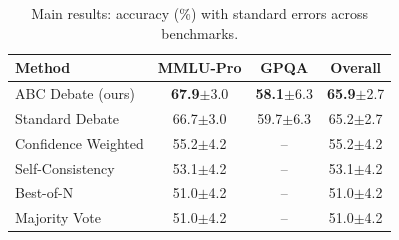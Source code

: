 \begin{table}[t]
\centering
\caption{Main results: accuracy (\%) with standard errors across benchmarks.}
\label{tab:main_results}
\small
\begin{tabular}{lccc}
\toprule
Method & MMLU-Pro & GPQA & Overall \\
\midrule
ABC Debate (ours) & \textbf{67.9}$\pm$3.0 & \textbf{58.1}$\pm$6.3 & \textbf{65.9}$\pm$2.7 \\
Standard Debate & 66.7$\pm$3.0 & 59.7$\pm$6.3 & 65.2$\pm$2.7 \\
Confidence Weighted & 55.2$\pm$4.2 & -- & 55.2$\pm$4.2 \\
Self-Consistency & 53.1$\pm$4.2 & -- & 53.1$\pm$4.2 \\
Best-of-N & 51.0$\pm$4.2 & -- & 51.0$\pm$4.2 \\
Majority Vote & 51.0$\pm$4.2 & -- & 51.0$\pm$4.2 \\
\bottomrule
\end{tabular}
\end{table}
